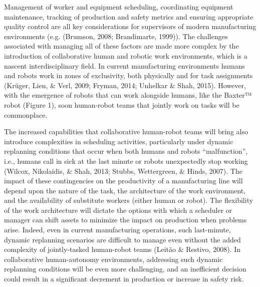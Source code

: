Management of worker and equipment scheduling, coordinating equipment maintenance, tracking of production and safety metrics and ensuring appropriate quality control are all key considerations for supervisors of modern manufacturing environments (e.g. (Brumson, 2008; Brandimarte, 1999)). The challenges associated with managing all of these factors are made more complex by the introduction of collaborative human and robotic work environments, which is a nascent interdisciplinary field. In current manufacturing environments humans and robots work in zones of exclusivity, both physically and for task assignments (Krüger, Lien, \& Verl, 2009; Fryman, 2014; Unhelkar \& Shah, 2015). However, with the emergence of robots that can work alongside humans, like the Baxter™ robot (Figure 1), soon human-robot teams  that jointly work on tasks will be commonplace. 

The increased capabilities that collaborative human-robot teams will bring also introduce complexities in scheduling activities, particularly under dynamic replanning conditions  that occur when both humans and robots “malfunction”, i.e., humans call in sick at the last minute or robots unexpectedly stop working (Wilcox, Nikolaidis, \& Shah, 2013; Stubbs, Wettergreen, \& Hinds, 2007). The impact of these contingencies on the productivity of a manufacturing line will depend upon the nature of the task, the architecture of the work environment, and the availability of substitute workers (either human or robot). The flexibility of the work architecture will dictate the options with which a scheduler or manager can shift assets to minimize the impact on production when problems arise. Indeed, even in current manufacturing operations, such last-minute, dynamic replanning scenarios are difficult to manage even without the added complexity of jointly-tasked human-robot teams (Leitão \& Restivo, 2008). In collaborative human-autonomy environments, addressing such dynamic replanning conditions will be even more challenging, and an inefficient decision could result in a significant decrement in production or increase in safety risk.

